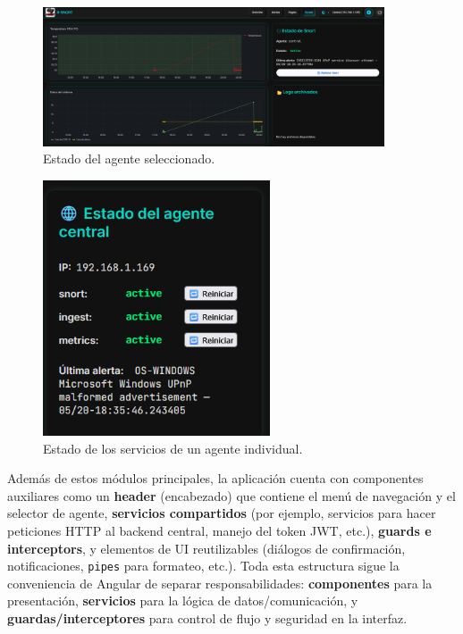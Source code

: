 \documentclass[11pt,a4paper,twoside]{report}
\begin{document}
\begin{itemize}
	\begin{figure}[H]
		\centering
		\includegraphics[width=0.9\textwidth]{documento/estado.png}
		\caption{Estado del agente seleccionado.}
		\label{fig:status-frontend}
	\end{figure}
	
		\begin{figure}[H]
		\centering
		\includegraphics[width=0.6\textwidth]{documento/estado_agente.png}
		\caption{Estado de los servicios de un agente individual.}
		\label{fig:status-agent-frontend}
	\end{figure}
\end{itemize}

Además de estos módulos principales, la aplicación cuenta con componentes auxiliares como un \textbf{header} (encabezado) que contiene el menú de navegación y el selector de agente, \textbf{servicios compartidos} (por ejemplo, servicios para hacer peticiones HTTP al backend central, manejo del token JWT, etc.), \textbf{guards e interceptors}, y elementos de UI reutilizables (diálogos de confirmación, notificaciones, \texttt{pipes} para formateo, etc.). Toda esta estructura sigue la conveniencia de Angular de separar responsabilidades: \textbf{componentes} para la presentación, \textbf{servicios} para la lógica de datos/comunicación, y \textbf{guardas/interceptores} para control de flujo y seguridad en la interfaz.
\end{document}
